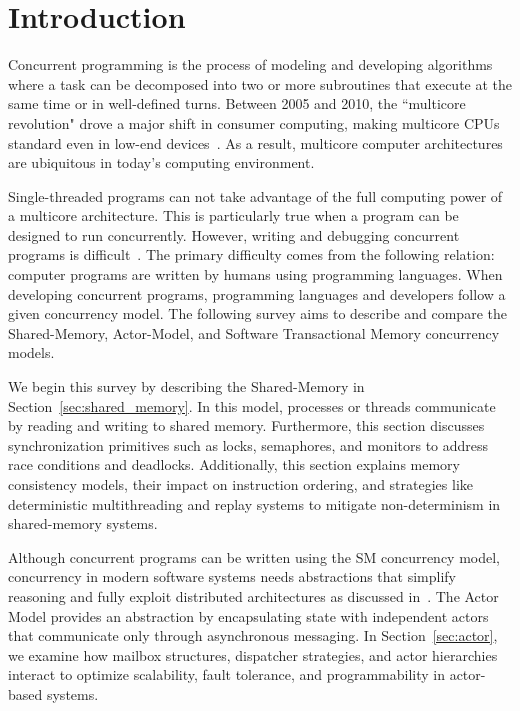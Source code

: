 \section{Introduction\label{sec:introduction}}
Concurrent programming is the process of modeling and
developing algorithms where a task can be decomposed into
two or more subroutines that execute at the same time or in well-defined turns.
Between 2005 and 2010, the ``multicore revolution" drove a major shift in consumer computing,
making multicore CPUs standard even in low-end devices~\cite{alseqyani2023history}.
As a result, multicore computer architectures are ubiquitous in today’s computing environment.

Single-threaded programs can not take advantage of the full computing power of a multicore architecture.
This is particularly true when a program can be designed to run concurrently.
However, writing and debugging concurrent programs is difficult~\cite{huang2016debuggingConcurrentPrograms}.
The primary difficulty comes from the following relation: computer programs
are written by humans using programming languages. 
When developing concurrent programs, programming languages and developers
follow a given concurrency model. The following survey aims to describe
and compare the Shared-Memory, Actor-Model, and Software Transactional Memory
concurrency models.

We begin this survey by describing the Shared-Memory
in Section~\ref{sec:shared_memory}.
In this model, processes or threads communicate by reading and writing
to shared memory.
Furthermore, this section discusses 
synchronization primitives such as locks, semaphores,
and monitors to address race conditions and deadlocks.
Additionally, this section explains memory consistency models,
their impact on instruction ordering,
and strategies like deterministic multithreading
and replay systems to mitigate
non-determinism in shared-memory systems.

Although concurrent programs can be written using the SM concurrency
model, concurrency in modern software systems needs abstractions
that simplify reasoning and fully exploit distributed
architectures as discussed in~\cite{10.1145/357980.358021}.
The Actor Model provides an abstraction by encapsulating state
with independent actors that communicate only through
asynchronous messaging. In Section~\ref{sec:actor},
we examine how mailbox structures, dispatcher strategies,
and actor hierarchies interact to optimize scalability, fault tolerance,
and programmability in actor-based systems.
